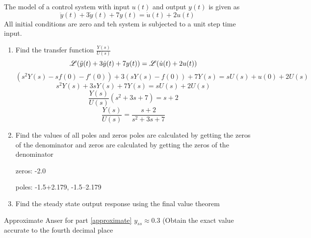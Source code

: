 
\item The model of a control system with input $u(t)$ and output $y(t)$ is given as
  \begin{equation}
    \ddot y(t) + 3\dot y(t) + 7y(t) = \dot u(t) + 2u(t)
  \end{equation}
  All initial conditions are zero and teh system is subjected to a unit step time input.
  \begin{enumerate}
  \item Find the transfer function $\frac{Y(s)}{U(s)}$\\
    \begin{equation}
      \mathscr{L}(\ddot y(t) + 3\dot y(t) + 7y(t)) = \mathscr{L}(\dot u(t) + 2u(t))
    \end{equation}
    \begin{equation}
      (s^2Y(s) -sf(0) - f'(0)) + 3(sY(s) - f(0)) + 7Y(s)= sU(s) + u(0)+ 2U(s)
    \end{equation}
    \begin{equation}
      s^2Y(s) + 3sY(s) + 7Y(s)= sU(s) + 2U(s)
    \end{equation}
    \begin{equation}
      \frac{Y(s)}{U(s)}(s^2 + 3s + 7) = s + 2
    \end{equation}
    \begin{equation}
      \frac{Y(s)}{U(s)} = \frac{s + 2}{s^2 + 3s + 7}
    \end{equation}
  \item Find the values of all poles and zeros
    poles are calculated by getting the zeros of the denominator and zeros are calculated by getting the zeros
    of the denominator
    
    zeros: -2.0
    
    poles: -1.5+2.179, -1.5--2.179
  \item Find the steady state output response using the final value theorem\label{approximate}
  \end{enumerate}
  Approximate Anser for part \ref{approximate} $y_{ss} \approx 0.3$ (Obtain the exact value accurate to the fourth
  decimal place
